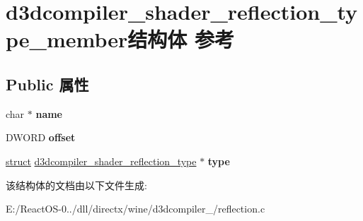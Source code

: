 \hypertarget{structd3dcompiler__shader__reflection__type__member}{}\section{d3dcompiler\+\_\+shader\+\_\+reflection\+\_\+type\+\_\+member结构体 参考}
\label{structd3dcompiler__shader__reflection__type__member}
\subsection*{Public 属性}
\begin{DoxyCompactItemize}
\item 
\mbox{\label{structd3dcompiler__shader__reflection__type__member_af46ed0c93f34eb9b7f6776724f5a2545}} 
char $\ast$ {\bfseries name}
\item 
\mbox{\label{structd3dcompiler__shader__reflection__type__member_af7ff38cdb71651e3afc106d3b780471b}} 
D\+W\+O\+RD {\bfseries offset}
\item 
\mbox{\label{structd3dcompiler__shader__reflection__type__member_a7686486705f4ddc29fa5da9a4bf4f436}} 
\hyperlink{interfacestruct}{struct} \hyperlink{structd3dcompiler__shader__reflection__type}{d3dcompiler\+\_\+shader\+\_\+reflection\+\_\+type} $\ast$ {\bfseries type}
\end{DoxyCompactItemize}


该结构体的文档由以下文件生成\+:\begin{DoxyCompactItemize}
\item 
E\+:/\+React\+O\+S-\/0../dll/directx/wine/d3dcompiler\+\_/reflection.\+c\end{DoxyCompactItemize}
